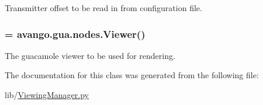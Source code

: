 \-Transmitter offset to be read in from configuration file. 

\hypertarget{classlib_1_1ViewingManager_1_1ViewingManager_ac90d3c36553d5b9c26d2719dbab03cbd}{
\subsubsection[{viewer}]{ = avango.\-gua.\-nodes.\-Viewer()}}\label{classlib_1_1ViewingManager_1_1ViewingManager_ac90d3c36553d5b9c26d2719dbab03cbd}


\-The guacamole viewer to be used for rendering. 



\-The documentation for this class was generated from the following file\-:\begin{DoxyCompactItemize}
\item 
lib/\hyperlink{ViewingManager_8py}{\-Viewing\-Manager.\-py}\end{DoxyCompactItemize}
